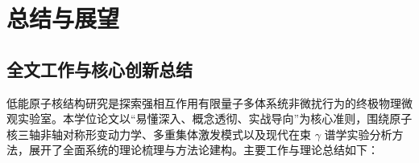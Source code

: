 
\chapter{总结与展望}
\label{ch:conclusion_outlook}

\section{全文工作与核心创新总结}
\label{sec:conclusion_summary}

低能原子核结构研究是探索强相互作用有限量子多体系统非微扰行为的终极物理微观实验室。本学位论文以“易懂深入、概念透彻、实战导向”为核心准则，围绕原子核三轴非轴对称形变动力学、多重集体激发模式以及现代在束 $\gamma$ 谱学实验分析方法，展开了全面系统的理论梳理与方法论建构。主要工作与理论总结如下：


